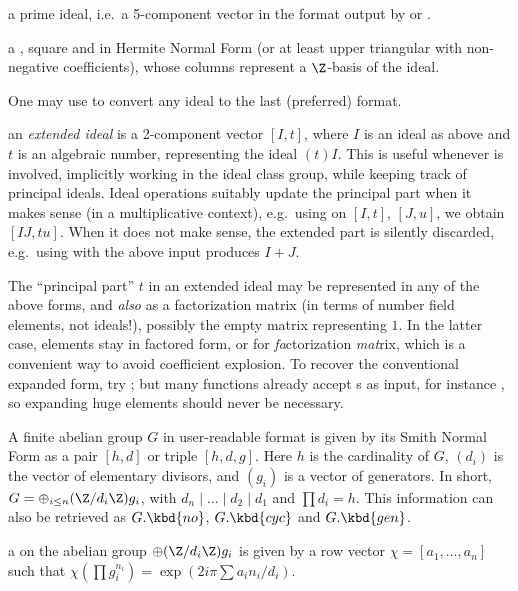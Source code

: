 \item a prime ideal, i.e.~a 5-component vector in the format output by
 or .

\item a , square and in Hermite Normal Form (or at least
upper triangular with non-negative coefficients), whose columns represent a
$\Z$-basis of the ideal.

One may use  to convert any ideal to the last (preferred) format.

\item an \emph{extended ideal}  is a 2-component
vector $[I, t]$, where $I$ is an ideal as above and $t$ is an algebraic
number, representing the ideal $(t)I$. This is useful whenever 
is involved, implicitly working in the ideal class group, while keeping track
of principal ideals. Ideal operations suitably update the principal part
when it makes sense (in a multiplicative context), e.g.~using 
on $[I,t]$, $[J,u]$, we obtain $[IJ, tu]$. When it does not make sense, the
extended part is silently discarded, e.g.~using  with the above
input produces $I+J$.

The ``principal part'' $t$ in an extended ideal may be
represented in any of the above forms, and \emph{also} as a factorization
matrix (in terms of number field elements, not ideals!), possibly the empty
matrix \kbd{[;]} representing $1$. In the latter case, elements stay in
factored form, or  for \emph{fa}ctorization \emph{mat}rix, which
is a convenient way to avoid coefficient explosion. To recover the
conventional expanded form, try ; but many functions
already accept s as input, for instance , so
expanding huge elements should never be necessary.


A finite abelian group $G$ in user-readable format is given by its Smith
Normal Form as a pair $[h,d]$ or triple $[h,d,g]$.
Here $h$ is the cardinality of $G$, $(d_i)$ is the vector of elementary
divisors, and $(g_i)$ is a vector of generators. In short,
$G = \oplus_{i\leq n} (\Z/d_i\Z) g_i$, with $d_n \mid \dots \mid d_2 \mid d_1$
and $\prod d_i = h$. This information can also be retrieved as
$G.\kbd{no}$, $G.\kbd{cyc}$ and $G.\kbd{gen}$.

\item a  on the abelian group
$\oplus (\Z/d_i\Z) g_i$
is given by a row vector $\chi = [a_1,\ldots,a_n]$ such that
$\chi(\prod g_i^{n_i}) = \exp(2i\pi\sum a_i n_i / d_i)$.

